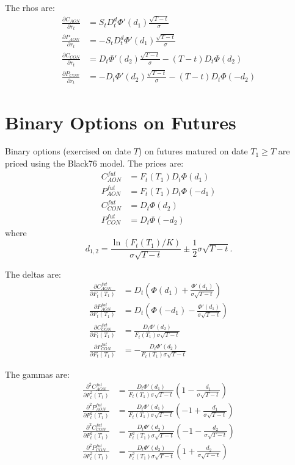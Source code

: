 The rhos are:
\begin{align}
	\frac{\partial C_{AON}}{\partial r_t}  
  	&= S_t D_t^d \Phi'(d_1) \frac{\sqrt{T-t}}{\sigma}  \\
	\frac{\partial P_{AON}}{\partial r_t}  
  	&= - S_t D_t^d \Phi'(d_1) \frac{\sqrt{T-t}}{\sigma}  \\
	\frac{\partial C_{CON}}{\partial r_t}  
  	&= D_t \Phi'(d_2) \frac{\sqrt{T-t}}{\sigma}  - (T-t) D_t \Phi(d_2)  \\
	\frac{\partial P_{CON}}{\partial r_t}  
  	&= - D_t \Phi'(d_2) \frac{\sqrt{T-t}}{\sigma}  - (T-t) D_t \Phi(-d_2)  
\end{align}

\section{Binary Options on Futures}
Binary options (exercised on date $T$) on futures matured on date $T_1\ge T$ 
are priced using the Black76 model. The prices are:
\begin{align}
	C_{AON}^{fut} &= F_t(T_1) D_t \Phi(d_1)   \\
	P_{AON}^{fut} &= F_t(T_1) D_t \Phi(-d_1)  \\
	C_{CON}^{fut} &= D_t \Phi(d_2)         \\
	P_{CON}^{fut} &= D_t \Phi(-d_2)        
\end{align}
where
\[
	d_{1,2}= \frac{\ln(F_t(T_1)/K)}{\sigma\sqrt{T-t}} 
	         \pm \frac{1}{2}\sigma\sqrt{T-t}.
\]

The deltas are:
\begin{align}
	\frac{\partial C_{AON}^{fut}}{\partial F_t(T_1)}  
  	&= D_t \left( \Phi(d_1) + \frac{\Phi'(d_1)}{\sigma\sqrt{T-t}} \right) \\
	\frac{\partial P_{AON}^{fut}}{\partial F_t(T_1)}  
  	&= D_t \left( \Phi(-d_1) - \frac{\Phi'(d_1)}{\sigma\sqrt{T-t}} \right) \\
	\frac{\partial C_{CON}^{fut}}{\partial F_t(T_1)}  
  	&= \frac{D_t\Phi'(d_2)}{F_t(T_1)\sigma\sqrt{T-t}}  \\
	\frac{\partial P_{CON}^{fut}}{\partial F_t(T_1)}  
  	&= - \frac{D_t\Phi'(d_2)}{F_t(T_1)\sigma\sqrt{T-t}}  
\end{align}

The gammas are:
\begin{align}
	\frac{\partial^2 C_{AON}^{fut}}{\partial F_t^2(T_1)}  
  	&= \frac{D_t\Phi'(d_1)}{F_t(T_1)\sigma\sqrt{T-t}}  
  	   \left( 1 - \frac{d_1}{\sigma\sqrt{T-t}} \right)   \\
	\frac{\partial^2 P_{AON}^{fut}}{\partial F_t^2(T_1)}  
  	&= \frac{D_t\Phi'(d_1)}{F_t(T_1)\sigma\sqrt{T-t}}  
  	   \left( -1 + \frac{d_1}{\sigma\sqrt{T-t}} \right)   \\
	\frac{\partial^2 C_{CON}^{fut}}{\partial F_t^2(T_1)}  
  	&= \frac{D_t\Phi'(d_2)}{F_t^2(T_1)\sigma\sqrt{T-t}}  
  	   \left( -1 - \frac{d_2}{\sigma\sqrt{T-t}} \right)   \\
	\frac{\partial^2 P_{CON}^{fut}}{\partial F_t^2(T_1)}  
  	&= \frac{D_t\Phi'(d_2)}{F_t^2(T_1)\sigma\sqrt{T-t}}  
  	   \left( 1 + \frac{d_2}{\sigma\sqrt{T-t}} \right)   
\end{align}

